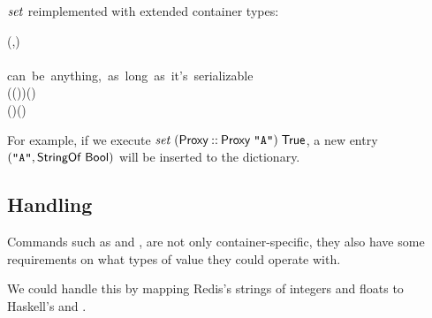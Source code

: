 \ensuremath{\Varid{set}} reimplemented with extended container types:

\begin{hscode}\SaveRestoreHook
{}%
%
%
%
\>[B]{}\mathbin{::}(\;,\;){}\<[E]%
\\
\>[B]{}\<[5]%
\>[5]{}\Rightarrow {}\;\<[E]%
\\
\>[B]{}\<[5]%
\>[5]{}\to {}\<[16]%
\>[16]{}\mbox{\onelinecomment  can be anything, as long as it's serializable}{}\<[E]%
\\
\>[B]{}\<[5]%
\>[5]{}\to {}\;\;(\;\;\;(\;))\;(\;\;){}\<[E]%
\\
\>[B]{}\;\;\mathrel{=}\mathbin{\$}\;(\;)\;(\;){}\<[E]%
\ColumnHook
\end{hscode}\resethooks

For example, if we execute \ensuremath{\Varid{set}\;(\Conid{Proxy}\mathbin{::}\Conid{Proxy}\;\text{\tt \char34 A\char34})\;\Conid{True}},
 a new entry \ensuremath{(\text{\tt \char34 A\char34},\Conid{StringOf}\;\Conid{Bool})} will
 be inserted to the dictionary.

\subsection{Handling }

Commands such as  and , are
 not only container-specific, they also have some requirements on what types of
 value they could operate with.

We could handle this by mapping Redis's strings of integers and floats to
 Haskell's  and .

